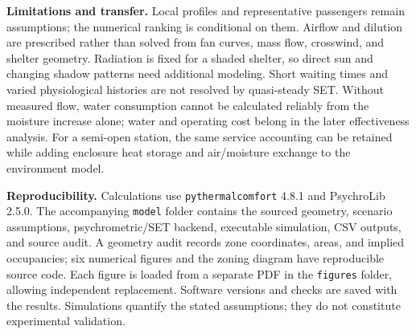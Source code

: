 \documentclass[12pt]{article}
\begin{document}
\noindent\textbf{Limitations and transfer.} Local profiles and representative passengers remain assumptions; the numerical ranking is conditional on them. Airflow and dilution are prescribed rather than solved from fan curves, mass flow, crosswind, and shelter geometry. Radiation is fixed for a shaded shelter, so direct sun and changing shadow patterns need additional modeling. Short waiting times and varied physiological histories are not resolved by quasi-steady SET. Without measured flow, water consumption cannot be calculated reliably from the moisture increase alone; water and operating cost belong in the later effectiveness analysis. For a semi-open station, the same service accounting can be retained while adding enclosure heat storage and air/moisture exchange to the environment model.

\noindent\textbf{Reproducibility.} Calculations use \texttt{pythermalcomfort} 4.8.1 and PsychroLib 2.5.0. The accompanying \texttt{model} folder contains the sourced geometry, scenario assumptions, psychrometric/SET backend, executable simulation, CSV outputs, and source audit. A geometry audit records zone coordinates, areas, and implied occupancies; six numerical figures and the zoning diagram have reproducible source code. Each figure is loaded from a separate PDF in the \texttt{figures} folder, allowing independent replacement. Software versions and checks are saved with the results. Simulations quantify the stated assumptions; they do not constitute experimental validation.
\end{document}
